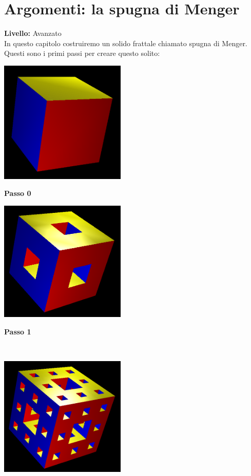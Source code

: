 \chapter{Argomenti: la spugna di Menger}
{ }\hfill\textbf{Livello:} Avanzato \\

In questo capitolo costruiremo un solido frattale chiamato spugna di Menger. Questi sono i primi passi per creare questo solito:

\begin{center}
	\begin{minipage}{6cm}
		\includegraphics[width=6cm]{pics/menger0.png}
		\begin{center}
			\textbf{Passo 0}
		\end{center}
	\end{minipage}
	\begin{minipage}{6cm}
		\includegraphics[width=6cm]{pics/menger1.png}
		\begin{center}
			\textbf{Passo 1}
		\end{center}
	\end{minipage}
\\
	\begin{minipage}{6cm}
		\includegraphics[width=6cm]{pics/menger2.png}

\end{minipage}
\end{center}
